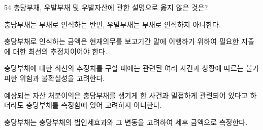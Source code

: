 \begin{question}{54}
충당부채, 우발부채 및 우발자산에 관한 설명으로 옳지 않은 것은?
\begin{choices}
  \item 충당부채는 부채로 인식하는 반면, 우발부채는 부채로 인식하지 아니한다.
  \item 충당부채로 인식하는 금액은 현재의무를 보고기간 말에 이행하기 위하여 필요한 지출에 대한 최선의 추정치이어야 한다.
  \item 충당부채에 대한 최선의 추정치를 구할 때에는 관련된 여러 사건과 상황에 따르는 불가피한 위험과 불확실성을 고려한다.
  \item 예상되는 자산 처분이익은 충당부채를 생기게 한 사건과 밀접하게 관련되어 있다고 하더라도 충당부채를 측정함에 있어 고려하지 아니한다.
  \item 충당부채는 충당부채의 법인세효과와 그 변동을 고려하여 세후 금액으로 측정한다.
\end{choices}
\end{question}
